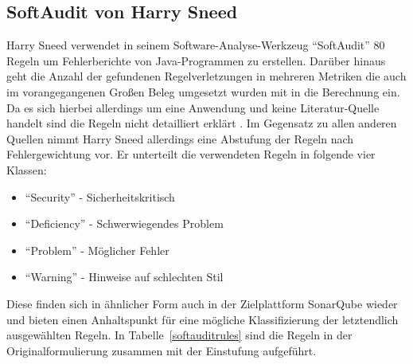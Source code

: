 \documentclass[da,ngerman]{stthesis}
\begin{document}
			\subsection{SoftAudit von Harry Sneed}
				Harry Sneed verwendet in seinem Software-Analyse-Werkzeug "`SoftAudit"' 80 Regeln um Fehlerberichte von Java-Programmen zu erstellen. Darüber hinaus geht die Anzahl der gefundenen Regelverletzungen in mehreren Metriken die auch im vorangegangenen Großen Beleg umgesetzt wurden \cite{grosserBeleg} mit in die Berechnung ein. Da es sich hierbei allerdings um eine Anwendung und keine Literatur-Quelle handelt sind die Regeln nicht detailliert erklärt \cite{SoftAuditDoku}. Im Gegensatz zu allen anderen Quellen nimmt Harry Sneed allerdings eine Abstufung der Regeln nach Fehlergewichtung vor. Er unterteilt die verwendeten Regeln in folgende vier Klassen:
				\begin{itemize}
					\item "`Security"' - Sicherheitskritisch 
					\item "`Deficiency"' - Schwerwiegendes Problem
					\item "`Problem"' - Möglicher Fehler
					\item "`Warning"' - Hinweise auf schlechten Stil
				\end{itemize}
				Diese finden sich in ähnlicher Form auch in der Zielplattform SonarQube wieder und bieten einen Anhaltspunkt für eine mögliche Klassifizierung der letztendlich ausgewählten Regeln. In Tabelle~\ref{softauditrules} sind die Regeln in der Originalformulierung zusammen mit der Einstufung aufgeführt.
\end{document}
